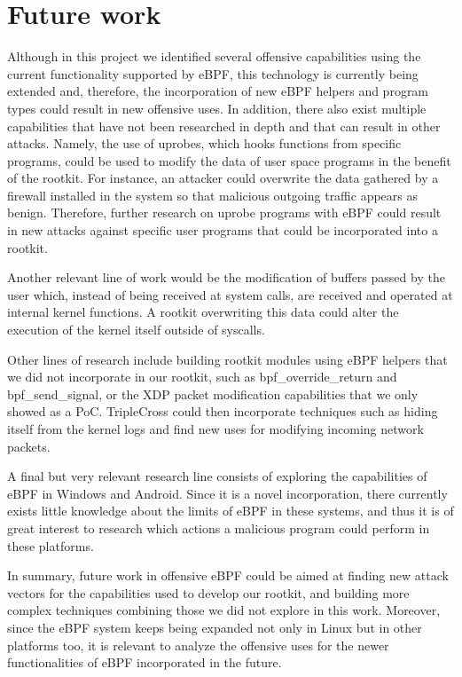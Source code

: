 \section{Future work}
Although in this project we identified several offensive capabilities
using the current functionality supported by eBPF, this technology is
currently being extended and, therefore, the incorporation of new eBPF
helpers and program types could result in new offensive uses.
%
In addition, there also exist multiple capabilities that have not been
researched in depth and that can result in other attacks. Namely, the use
of uprobes, which hooks functions from specific programs, could be used to
modify the data of user space programs in the benefit of the rootkit. For
instance, an attacker could overwrite the data gathered by a firewall
installed in the system so that malicious outgoing traffic appears as
benign. Therefore, further research on uprobe programs with eBPF could
result in new attacks against specific user programs that could be
incorporated into a rootkit.

Another relevant line of work would be the modification of buffers passed
by the user which, instead of being received at system calls, are received
and operated at internal kernel functions. A rootkit overwriting this data
could alter the execution of the kernel itself outside of syscalls.

Other lines of research include building rootkit modules using eBPF helpers
that we did not incorporate in our rootkit, such as bpf\_override\_return
and  bpf\_send\_signal, or the XDP packet modification capabilities that we
only showed as a PoC. TripleCross could then incorporate techniques such as
hiding itself from the kernel logs and find new uses for modifying incoming
network packets.

A final but very relevant research line consists of exploring the
capabilities of eBPF in Windows and Android. Since it is a novel
incorporation, there currently exists little knowledge about the limits of
eBPF in these systems, and thus it is of great interest to research which
actions a malicious program could perform in these platforms.

In summary, future work in offensive eBPF could be aimed at finding new
attack vectors for the capabilities used to develop our rootkit, and
building more complex techniques combining those we did not explore in this
work. Moreover, since the eBPF system keeps being expanded not only in
Linux but in other platforms too, it is relevant to analyze the offensive
uses for the newer functionalities of eBPF incorporated in the future.
